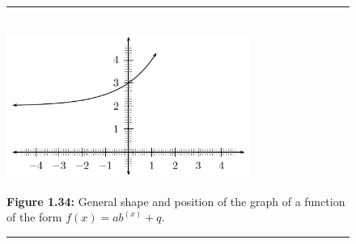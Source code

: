 	\begin{figure}[H] %
    \begin{center}
    \rule[.1in]{\figurerulewidth}{.005in} \\
        \label{m39348*uid173!!!underscore!!!media}\label{m39348*uid173!!!underscore!!!printimage}\includegraphics[width=300px]{col11306.imgs/m39348_MG10C11_027.png} %
        
      \vspace{2pt}
    \vspace{\rubberspace}\par \begin{cnxcaption}
	  \small \textbf{Figure 1.34: }General shape and position of the graph of a function of the form \begin{math}f\left(x\right)=a{b}^{\left(x\right)}+q\end{math}.
	\end{cnxcaption}
      
    \vspace{.1in}
    \rule[.1in]{\figurerulewidth}{.005in} \\
        
    \end{center}

 \end{figure}   

    \addtocounter{footnote}{-0}
    
\label{m39348*secfhsst!!!underscore!!!id3489}
            \nopagebreak
            

